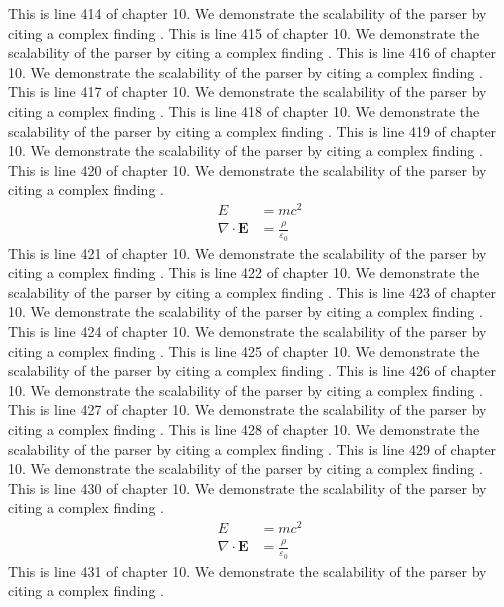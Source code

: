 This is line 414 of chapter 10. We demonstrate the scalability of the parser by citing a complex finding \cite{ref10_414}.
This is line 415 of chapter 10. We demonstrate the scalability of the parser by citing a complex finding \cite{ref10_415}.
This is line 416 of chapter 10. We demonstrate the scalability of the parser by citing a complex finding \cite{ref10_416}.
This is line 417 of chapter 10. We demonstrate the scalability of the parser by citing a complex finding \cite{ref10_417}.
This is line 418 of chapter 10. We demonstrate the scalability of the parser by citing a complex finding \cite{ref10_418}.
This is line 419 of chapter 10. We demonstrate the scalability of the parser by citing a complex finding \cite{ref10_419}.
This is line 420 of chapter 10. We demonstrate the scalability of the parser by citing a complex finding \cite{ref10_420}.
\begin{align*}
  E &= mc^2 \\
  \nabla \cdot \mathbf{E} &= \frac{\rho}{\varepsilon_0}
\end{align*}
This is line 421 of chapter 10. We demonstrate the scalability of the parser by citing a complex finding \cite{ref10_421}.
This is line 422 of chapter 10. We demonstrate the scalability of the parser by citing a complex finding \cite{ref10_422}.
This is line 423 of chapter 10. We demonstrate the scalability of the parser by citing a complex finding \cite{ref10_423}.
This is line 424 of chapter 10. We demonstrate the scalability of the parser by citing a complex finding \cite{ref10_424}.
This is line 425 of chapter 10. We demonstrate the scalability of the parser by citing a complex finding \cite{ref10_425}.
This is line 426 of chapter 10. We demonstrate the scalability of the parser by citing a complex finding \cite{ref10_426}.
This is line 427 of chapter 10. We demonstrate the scalability of the parser by citing a complex finding \cite{ref10_427}.
This is line 428 of chapter 10. We demonstrate the scalability of the parser by citing a complex finding \cite{ref10_428}.
This is line 429 of chapter 10. We demonstrate the scalability of the parser by citing a complex finding \cite{ref10_429}.
This is line 430 of chapter 10. We demonstrate the scalability of the parser by citing a complex finding \cite{ref10_430}.
\begin{align*}
  E &= mc^2 \\
  \nabla \cdot \mathbf{E} &= \frac{\rho}{\varepsilon_0}
\end{align*}
This is line 431 of chapter 10. We demonstrate the scalability of the parser by citing a complex finding \cite{ref10_431}.
